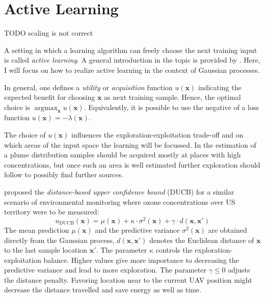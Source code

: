\documentclass[11pt,a4paper,twoside,BCOR=15mm]{scrreprt}
\newcommand{\vc}[1]{\bm{#1}}
\DeclareMathOperator*{\argmax}{argmax}
\newcommand{\ped}[1]{_{\mathrm{#1}}}
\newcommand{\newterm}[1]{\emph{#1}}
\begin{document}
\section{Active Learning}
TODO scaling is not correct

A setting in which a learning algorithm can freely choose the next training 
input is called \newterm{active learning}. A general introduction in the topic 
is provided by \textcite{Settles:2009vo}. Here, I will focus on how to realize 
active learning in the context of Gaussian processes.

In general, one defines a \newterm{utility} or \newterm{acquisition} function 
$u(\vc x)$ indicating the expected benefit for choosing $\vc x$ as next training 
sample. Hence, the optimal choice is $\argmax_{\vc x} u(\vc x)$. Equivalently, 
it is possible to use the negative of a loss function $u(\vc x) = - \lambda(\vc 
x)$.

The choice of $u(\vc x)$ influences the exploration-exploitation trade-off and 
on which areas of the input space the learning will be focussed. In the 
estimation of a plume distribution samples should be acquired mostly at places 
with high concentrations, but once such an area is well estimated further 
exploration should follow to possibly find further sources.

\Textcite{Marchant:2012wb} proposed the \newterm{distance-based upper confidence 
    bound} (DUCB) for a similar scenario of environmental monitoring where ozone 
concentrations over US territory were to be measured:
\begin{equation}
    u\ped{DUCB}(\vc x) = \mu(\vc x) + \kappa \cdot \sigma^2(\vc x) + \gamma 
    \cdot d(\vc x, \vc x')
\end{equation}
The mean prediction $\mu(\vc x)$ and the predictive variance $\sigma^2(\vc x)$ 
are obtained directly from the Gaussian process, $d(\vc x, \vc x')$ denotes the 
Euclidean distance of $\vc x$ to the last sample location $\vc x'$. The 
parameter $\kappa$ controls the exploration-exploitation balance. Higher values 
give more importance to decreasing the predictive variance and lead to more 
exploration. The parameter $\gamma \leq 0$ adjusts the distance penalty.  
Favoring location near to the current UAV position might decrease the distance 
travelled and save energy as well as time.
\end{document}
